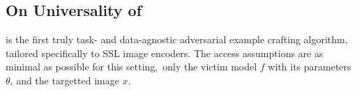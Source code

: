 \subsection{On Universality of \EmbedAttack}

\EmbedAttack is the first truly task- and data-agnostic adversarial example crafting algorithm, tailored specifically to SSL image encoders. The access assumptions are as minimal as possible for this setting,~\ie only the victim model $f$ with its parameters $\theta$, and the targetted image $x$. 
